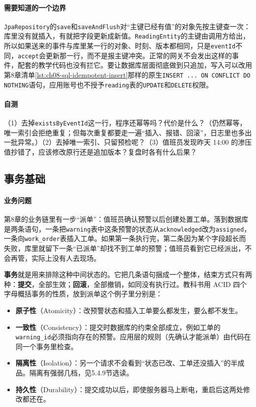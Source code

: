 \paragraph{需要知道的一个边界}\texttt{JpaRepository}的\texttt{save}和\texttt{saveAndFlush}对“主键已经有值”的对象先按主键查一次：库里没有就插入，有就把字段更新成新值。\texttt{ReadingEntity}的主键由调用方给出，所以如果送来的事件与库里某一行的对象、时刻、版本都相同，只是\texttt{eventId}不同，\texttt{accept}会更新那一行，而不是报主键冲突。正常的网关不会发出这样的事件，配套的教学代码也没有拦它。要让数据库层面彻底做到只追加，写入可以改用第8章清单\ref{lst:ch08-sql-idempotent-insert}那样的原生\texttt{INSERT ... ON CONFLICT DO NOTHING}语句，应用账号也不授予\texttt{reading}表的\texttt{UPDATE}和\texttt{DELETE}权限。

\paragraph{自测}（1）去掉\texttt{existsByEventId}这一行，程序还幂等吗？代价是什么？（仍然幂等，唯一索引会拒绝重复；但每次重复都要走一遍“插入、报错、回滚”，日志里也多出一批异常。）（2）去掉唯一索引、只留预检呢？（3）值班员发现昨天 14:00 的渗压值抄错了，应该修改原行还是追加版本？复盘时各有什么后果？

\subsection{事务基础}

\paragraph{业务问题}第8章的业务链里有一步“派单”：值班员确认预警以后创建处置工单。落到数据库是两条语句，一条把\texttt{warning}表中这条预警的状态从\texttt{acknowledged}改为\texttt{assigned}，一条向\texttt{work\_order}表插入工单。如果第一条执行完，第二条因为某个字段超长而失败，库里就留下一条“已派单”却找不到工单的预警；值班员看到它已经派出，不会再管，实际上没有人去现场。

\textbf{事务}就是用来排除这种中间状态的。它把几条语句捆成一个整体，结束方式只有两种：\textbf{提交}，全部生效；\textbf{回滚}，全部撤销，如同没有执行过。教科书用 ACID 四个字母概括事务的性质，放到派单这个例子里分别是：
\begin{itemize}
\item \textbf{原子性}（Atomicity）：改预警状态和插入工单要么都发生，要么都不发生。
\item \textbf{一致性}（Consistency）：提交时数据库的约束全部成立，例如工单的\texttt{warning\_id}必须指向存在的预警。应用层的规则（先确认才能派单）由代码在同一个事务里检查。
\item \textbf{隔离性}（Isolation）：另一个请求不会看到“状态已改、工单还没插入”的半成品。隔离有强弱几档，见5.4.9节选读。
\item \textbf{持久性}（Durability）：提交成功以后，即使服务器马上断电，重启后这两处修改都还在。
\end{itemize}

